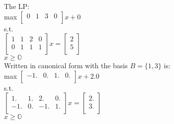 \documentclass{article}
\begin{document}
The LP: \\
 max $\begin{bmatrix}  
  0 & 1 & 3 & 0\\      
\end{bmatrix}x + 0$ \\ 

s.t. \\
$\begin{bmatrix}
  1 & 1 & 2 & 0\\
  0 & 1 & 1 & 1\\
\end{bmatrix}x = \begin{bmatrix}
  2\\
  5\\
\end{bmatrix}$\\
$x \geq\mathbb{O}$ \\

Written in canonical form with the basis $B = \{1, 3\}$ is: \\ 

max $\begin{bmatrix}
  -1. & 0. & 1. & 0.\\
\end{bmatrix}x + 2.0$ \\

s.t. \\
$\begin{bmatrix}
  1. & 1. & 2. & 0.\\
  -1. & 0. & -1. & 1.\\
\end{bmatrix}x = \begin{bmatrix}
  2.\\
  3.\\
\end{bmatrix}$\\
$x \geq\mathbb{O}$ \\
\end{document}
